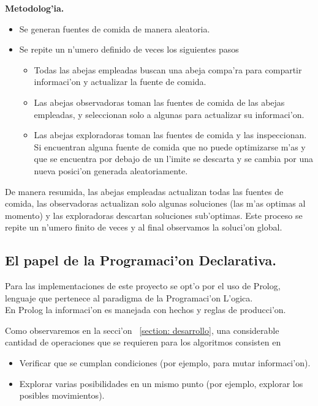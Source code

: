 \documentclass[12pt]{article}
\begin{document}
    \textbf{Metodolog'ia.}
    \begin{itemize}
        \item Se generan fuentes de comida de manera aleatoria.
        \item Se repite un n'umero definido de veces los siguientes pasos
            \begin{itemize}
                \setlength\itemsep{0em}
                \item Todas las abejas empleadas buscan una abeja compa'ra para compartir informaci'on y actualizar
                    la fuente de comida.
                \item Las abejas observadoras toman las fuentes de comida de las abejas empleadas, y seleccionan
                    solo a algunas para actualizar su informaci'on.
                \item Las abejas exploradoras toman las fuentes de comida y las inspeccionan. Si encuentran
                alguna fuente de comida que no puede optimizarse m'as y que se encuentra por debajo de un l'imite
                se descarta y se cambia por una nueva posici'on generada aleatoriamente.

            \end{itemize}

    \end{itemize}

    De manera resumida, las abejas empleadas actualizan todas las fuentes de comida, las observadoras
    actualizan solo algunas soluciones (las m'as optimas al momento) y las exploradoras descartan soluciones
    sub'optimas. Este proceso se repite un n'umero finito de veces y al final observamos
    la soluci'on global.

    \subsection{El papel de la Programaci'on Declarativa.}
    Para las implementaciones de este proyecto se opt'o por el uso de Prolog, lenguaje que pertenece
    al paradigma de la Programaci'on L'ogica. \\
    En Prolog la informaci'on es manejada con hechos y reglas de producci'on.

    Como observaremos en la secci'on ~\ref{section: desarrollo}, una considerable cantidad de operaciones
    que se requieren para los algoritmos consisten en
    \begin{itemize}
        \item Verificar que se cumplan condiciones (por ejemplo, para mutar informaci'on).
        \item Explorar varias posibilidades en un mismo punto (por ejemplo, explorar los posibles movimientos).
    \end{itemize}
\end{document}
